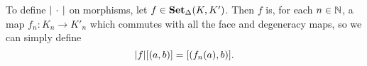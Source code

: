 \documentclass[main.tex]{subfiles}
\begin{document}
To define ${| \,\cdot\, |}$ on morphisms, let $f \in \operatorname{\mathbf{Set}_{\Delta}}(K, K')$. Then $f$ is, for each $n \in \mathbb{N}$, a map $f_{n}\colon K_{n} \to K'_{n}$ which commutes with all the face and degeneracy maps, so we can simply define
\begin{equation*}
  {| f |}[(a, b)] = [(f_{n}(a), b)].
\end{equation*}

%
%
%
\end{document}
